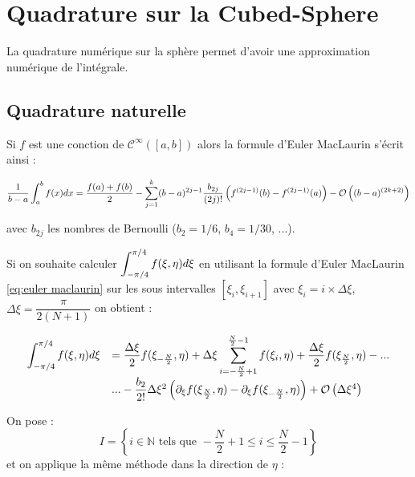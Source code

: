 \section{Quadrature sur la Cubed-Sphere}

La quadrature numérique sur la sphère permet d'avoir une approximation numérique de l'intégrale. 






\subsection{Quadrature naturelle}

Si $f$ est une conction de $\mathcal{C}^{\infty}([a,b])$ alors la formule d'Euler MacLaurin s'écrit ainsi :

\begin{equation}
\dfrac{1}{b-a} \displaystyle\int_a^b f(x)dx = \dfrac{f(a)+f(b)}{2} - \displaystyle\sum\limits_{j=1}^k (b-a)^{2j-1} \dfrac{b_{2j}}{(2j)!} \left( f^{(2j-1)}(b) - f^{(2j-1)}(a) \right) - \mathcal{O}\left( (b-a)^{(2k+2)} \right)
\label{eq:euler maclaurin}
\end{equation}

avec $b_{2j}$ les nombres de Bernoulli ($b_2=1/6$, $b_4=1/30$, ...).

Si on souhaite calculer $\displaystyle\int_{-\pi/4}^{\pi/4} f(\xi,\eta)d\xi$ en utilisant la formule d'Euler MacLaurin \eqref{eq:euler maclaurin} sur les sous intervalles $[\xi_i, \xi_{i+1}]$ avec $\xi_i= i \times \Delta \xi$, $\Delta \xi = \dfrac{\pi}{2(N+1)}$ on obtient :

\begin{equation}
\begin{array}{rl}
\displaystyle\int_{-\pi/4}^{\pi/4} f(\xi,\eta)d\xi & = \dfrac{\Delta \xi}{2} f(\xi_{-\frac{N}{2}},\eta) +  \Delta \xi \displaystyle\sum\limits_{i=-\frac{N}{2}+1}^{\frac{N}{2}-1} f(\xi_i,\eta) + \frac{\Delta \xi}{2} f(\xi_{\frac{N}{2}},\eta)- ...\\
                                       & ... - \dfrac{b_2}{2!} \Delta \xi^2 \left( \partial_\xi f(\xi_{\frac{N}{2}},\eta) - \partial_\xi f(\xi_{-\frac{N}{2}},\eta) \right) + \mathcal{O} \left( \Delta \xi ^4 \right)
\end{array}
\end{equation}

On pose : $$I = \left\lbrace i\in\mathbb{N} \text{ tels que } -\frac{N}{2}+1 \leq i \leq \frac{N}{2}-1 \right\rbrace$$ et on applique la même méthode dans la direction de $\eta$  :

